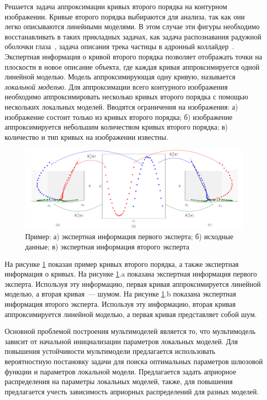 Решается задача аппроксимации кривых второго порядка на контурном изображении. Кривые второго порядка выбираются для анализа, так как они легко описываются линейными моделями. В этом случае эти фигуры необходимо восстанавливать в таких прикладных задачах, как задача распознавания радужной оболочки глаза~\cite{Matveev2010,Matveev2014,Bowyer2010}, задача описания трека частицы в адронный коллайдер~\cite{Dalila2018}. Экспертная информация о кривой второго порядка позволяет отображать точки на плоскости в новое описание объекта, где каждая кривая аппроксимируется одной линейной моделью. Модель аппроксимирующая одну кривую, называется \textit{локальной моделью}. Для аппроксимации всего контурного изображения необходимо аппроксимировать несколько кривых второго порядка с помощью нескольких локальных моделей. Вводятся ограничения на изображения: а) изображение состоит только из кривых второго порядка; б) изображение аппроксимируется небольшим количеством кривых второго порядка; в) количество и тип кривых на изображении известны.

\begin{figure}[h!]
\center
     \includegraphics[width=\textwidth]{results/priorexpertfig/explanation}
     \caption{Пример: а) экспертная информация первого эксперта; б) исходные данные; в) экспертная информация второго эксперта}
    \label{intro:fig2}
\end{figure}
На рисунке \ref{intro:fig2} показан пример кривых второго порядка, а также экспертная информация о кривых. На рисунке \ref{intro:fig2}.a показана экспертная информация первого эксперта. Используя эту информацию, первая кривая аппроксимируется линейной моделью, а вторая кривая~--- шумом. На рисунке \ref{intro:fig2}.b показана экспертная информация второго эксперта. Используя эту информацию, вторая кривая аппроксимируется линейной моделью, а первая кривая представляет собой шум.

Основной проблемой построения мультимоделей является то, что мультимодель зависит от начальной инициализации параметров локальных моделей. Для повышения устойчивости мультимодели предлагается использовать вероятностную постановку задачи для поиска оптимальных параметров шлюзовой функции и параметров локальной модели. Предлагается задать априорное распределения на параметры локальных моделей, также, для повышения предлагается учесть зависимость априорных распределений для разных моделей.

